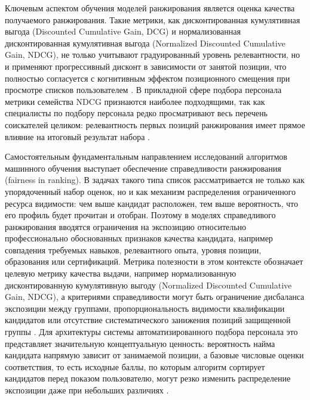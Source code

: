 Ключевым аспектом обучения моделей ранжирования является оценка качества получаемого ранжирования. Такие метрики, как дисконтированная кумулятивная выгода (Discounted Cumulative Gain, DCG) и нормализованная дисконтированная кумулятивная выгода (Normalized Discounted Cumulative Gain, NDCG), не только учитывают градуированный уровень релевантности, но и применяют прогрессивный дисконт в зависимости от занятой позиции, что полностью согласуется с когнитивным эффектом позиционного смещения при просмотре списков пользователем \cite{src10}. В прикладной сфере подбора персонала метрики семейства NDCG признаются наиболее подходящими, так как специалисты по подбору персонала редко просматривают весь перечень соискателей целиком: релевантность первых позиций ранжирования имеет прямое влияние на итоговый результат набора \cite{src02, src16}.\par
Самостоятельным фундаментальным направлением исследований алгоритмов машинного обучения выступает обеспечение справедливости ранжирования (fairness in ranking). В задачах такого типа список рассматривается не только как упорядоченный набор оценок, но и как механизм распределения ограниченного ресурса видимости: чем выше кандидат расположен, тем выше вероятность, что его профиль будет прочитан и отобран. Поэтому в моделях справедливого ранжирования вводятся ограничения на экспозицию относительно профессионально обоснованных признаков качества кандидата, например совпадения требуемых навыков, релевантного опыта, уровня позиции, образования или сертификаций. Метрика полезности в этом контексте обозначает целевую метрику качества выдачи, например нормализованную дисконтированную кумулятивную выгоду (Normalized Discounted Cumulative Gain, NDCG), а критериями справедливости могут быть ограничение дисбаланса экспозиции между группами, пропорциональность видимости квалификации кандидатов или отсутствие систематического занижения позиций защищенной группы \cite{src16, src36, src37}. Для архитектуры системы автоматизированного подбора персонала это представляет значительную концептуальную ценность: вероятность найма кандидата напрямую зависит от занимаемой позиции, а базовые числовые оценки соответствия, то есть исходные баллы, по которым алгоритм сортирует кандидатов перед показом пользователю, могут резко изменить распределение экспозиции даже при небольших различиях \cite{src02, src16}.\par
